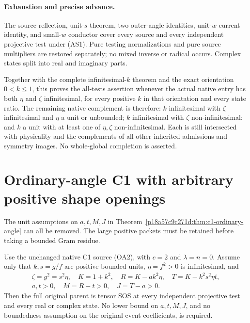 \paragraph{Exhaustion and precise advance.}
The source reflection, unit-$s$ theorem, two outer-angle identities,
unit-$w$ current identity, and small-$w$ conductor cover every source
and every independent projective test under (AS1). Pure testing
normalizations and pure source multipliers are restored separately;
no mixed inverse or radical occurs. Complex states split into real
and imaginary parts.

Together with the complete infinitesimal-$k$ theorem and the exact
orientation $0<k\le1$, this proves the all-tests assertion whenever
the actual native entry has both $\eta$ and $\zeta$ infinitesimal,
for every positive $k$ in that orientation and every state ratio.
The remaining native complement is therefore: $k$ infinitesimal with
$\zeta$ infinitesimal and $\eta$ a unit or unbounded; $k$
infinitesimal with $\zeta$ non-infinitesimal; and $k$ a unit with
at least one of $\eta,\zeta$ non-infinitesimal. Each is still
intersected with physicality and the complements of all other inherited
admissions and symmetry images. No whole-global completion is asserted.


\section{\texorpdfstring{Ordinary-angle C1 with arbitrary positive shape openings}{Ordinary-angle C1 with arbitrary positive shape openings}}
\label{component:p64b054e815d0}

\label{p64b054e815d0:sec:c1-arbitrary-openings}

The unit assumptions on $a,t,M,J$ in
Theorem~\ref{p18a57c9c271d:thm:c1-ordinary-angle} can all be removed. The large
positive packets must be retained before taking a bounded Gram residue.

\begin{theorem}
Use the unchanged native C1 source (OA2), with $c=2$ and
$\lambda=n=0$. Assume only that $k,s=g/f$ are positive bounded units,
$\eta=f^2>0$ is infinitesimal, and
\[
\begin{gathered}
 \zeta=g^2=s^2\eta,\quad K=1+k^2,\quad
 R=K-ak^2\eta,\quad T=K-k^2s^2\eta t,\\
 a,t>0,\quad M=R-t>0,\quad J=T-a>0.
\end{gathered}\tag{AO1}
\]
Then the full original parent is tensor SOS at every independent
projective test and every real or complex state. No lower bound on
$a,t,M,J$, and no boundedness assumption on the original event
coefficients, is required.
\end{theorem}

